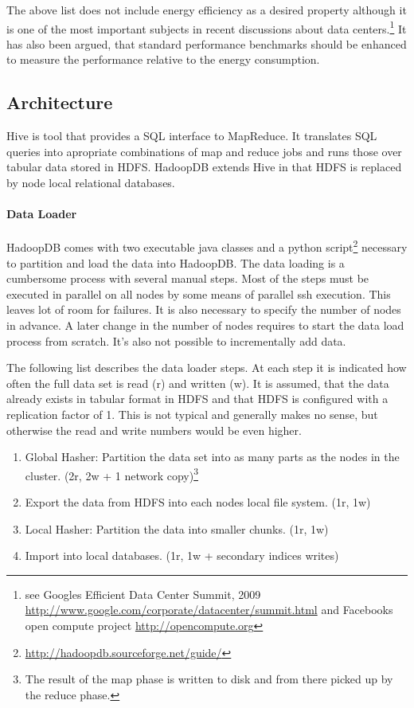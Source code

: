 \documentclass[12pt,a4paper]{scrartcl}		%
\begin{document}
The above list does not include energy efficiency as a desired property although it is one of the most important subjects in recent discussions about data centers.\footnote{see Googles Efficient Data Center Summit, 2009 \url{http://www.google.com/corporate/datacenter/summit.html} and Facebooks open compute project \url{http://opencompute.org}} It has also been argued, that standard performance benchmarks should be enhanced to measure the performance relative to the energy consumption.\cite{Fanara:2009:SEP:1692899.1692904}

\subsection{Architecture}
Hive is tool that provides a SQL interface to MapReduce. It translates SQL queries into apropriate combinations of map and reduce jobs and runs those over tabular data stored in HDFS. HadoopDB extends Hive in that HDFS is replaced by node local relational databases.

\paragraph{Data Loader}
HadoopDB comes with two executable java classes and a python script\footnote{\url{http://hadoopdb.sourceforge.net/guide/}} necessary to partition and load the data into HadoopDB. The data loading is a cumbersome process with several manual steps. Most of the steps must be executed in parallel on all nodes by some means of parallel ssh execution. This leaves lot of room for failures. It is also necessary to specify the number of nodes in advance. A later change in the number of nodes requires to start the data load process from scratch. It's also not possible to incrementally add data.

The following list describes the data loader steps. At each step it is indicated how often the full data set is read (r) and written (w). It is assumed, that the data already exists in tabular format in HDFS and that HDFS is configured with a replication factor of 1. This is not typical and generally makes no sense, but otherwise the read and write numbers would be even higher.

\begin{enumerate}
\item Global Hasher: Partition the data set into as many parts as the nodes in the cluster. (2r, 2w + 1 network copy)\footnote{The result of the map phase is written to disk and from there picked up by the reduce phase.}
\item Export the data from HDFS into each nodes local file system. (1r, 1w)
\item Local Hasher: Partition the data into smaller chunks. (1r, 1w)
\item Import into local databases. (1r, 1w + secondary indices writes)
\end{enumerate}
\end{document}
